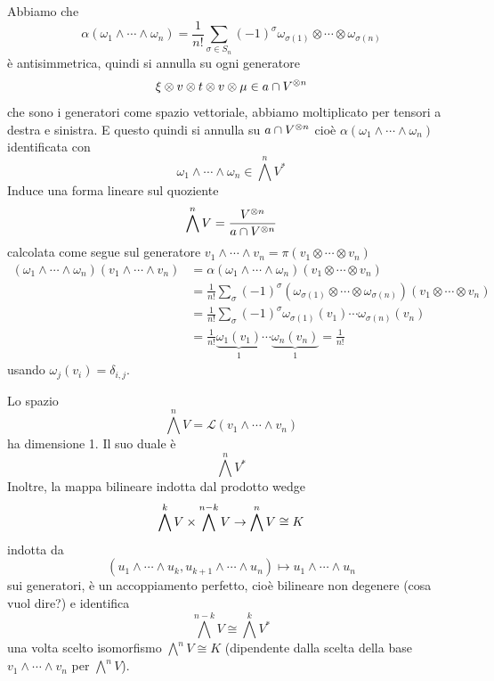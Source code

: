 \documentclass[a4paper]{article}
\begin{document}
\begin{snippetproof}{}
    Abbiamo che
    \[
        \alpha(\omega_1 \wedge \cdots \wedge \omega_n)
        = \frac{1}{n!} \sum_{\sigma \in S_n}
        (-1)^\sigma \omega_{\sigma(1)} \otimes \cdots \otimes \omega_{\sigma(n)}
    \]
    è antisimmetrica, quindi si annulla su ogni generatore
    \[
        \xi \otimes v \otimes t \otimes v \otimes \mu \in a \cap V^{\otimes n}
    \]
    che sono i generatori come spazio vettoriale, abbiamo moltiplicato per tensori a destra e sinistra. 
    E questo quindi si annulla su \(a \cap V^{\otimes n}\)
    cioè \(\alpha(\omega_1 \wedge \cdots \wedge \omega_n)\) identificata con
    \[
        \omega_1 \wedge \cdots \wedge \omega_n
        \in \bigwedge^n V^*
    \]
    Induce una forma lineare sul quoziente \[
        \bigwedge^n V = \frac{V^{\otimes n}}{a \cap V^{\otimes n}}
    \]
    calcolata come segue sul generatore \(v_1 \wedge \cdots \wedge v_n
    = \pi(v_1 \otimes \cdots \otimes v_n)\) \begin{align*}
        (\omega_1 \wedge \cdots \wedge \omega_n)
        (v_1 \wedge \cdots \wedge v_n)
        &= \alpha(\omega_1 \wedge \cdots \wedge \omega_n)
        (v_1 \otimes \cdots \otimes v_n) \\
        &= \frac{1}{n!} \sum_\sigma (-1)^\sigma
        \left(
            \omega_{\sigma(1)} \otimes \cdots \otimes \omega_{\sigma(n)}
        \right)
        \left(
            v_1 \otimes \cdots \otimes v_n
        \right) \\
        &= \frac{1}{n!} \sum_\sigma (-1)^{\sigma}
        \omega_{\sigma(1)}(v_1) \cdots \omega_{\sigma(n)}(v_n) \\
        &= \frac{1}{n!} \underbrace{\omega_1(v_1)}_{1} \cdots
        \underbrace{\omega_n(v_n)}_{1} = \frac{1}{n!}
    \end{align*}
    usando \(\omega_j(v_i) = \delta_{i,j}\).
\end{snippetproof}

\begin{snippetcorollary}{}
    Lo spazio \[
        \bigwedge^n V  = \mathcal L(v_1 \wedge \cdots \wedge v_n)
    \]
    ha dimensione 1. Il suo duale è \[
        \bigwedge^n V^*
    \]
    Inoltre, la mappa bilineare indotta dal prodotto wedge
    \[
        \bigwedge^k V \times \bigwedge^{n-k} V
        \to \bigwedge^n V \cong K
    \]
    indotta da \[
        (u_1 \wedge \cdots \wedge u_k,
        u_{k+1} \wedge \cdots \wedge u_n) \mapsto u_1 \wedge \cdots \wedge u_n
    \]
    sui generatori, è un accoppiamento perfetto, cioè
    bilineare non degenere (cosa vuol dire?) e identifica \[
        \bigwedge^{n-k} V \cong \bigwedge^k V^*
    \]
    una volta scelto isomorfismo \(\bigwedge^n V \cong K\)
    (dipendente dalla scelta della base \(v_1 \wedge \cdots \wedge v_n\) per \(\bigwedge^n V\)).
\end{snippetcorollary}
\end{document}
